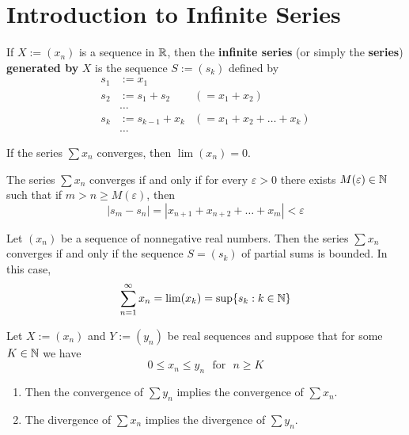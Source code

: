 \section{Introduction to Infinite Series}

\begin{definition}
	If $X:=(x_n)$ is a sequence in $\mathbb{R}$, then the \textbf{infinite series} (or simply the \textbf{series}) \textbf{generated by} $X$ is the sequence $S:= (s_k)$ defined by
	\begin{align*}
		s_1 & := x_1                                \\
		s_2 & := s_1 + s_2   & (=x_1 + x_2)         \\
		    & \dots                                 \\
		s_k & := s_{k-1}+x_k & (=x_1+x_2+\dots+x_k) \\
		    & \dots
	\end{align*}
\end{definition}

\begin{theorem}
	If the series $\sum x_n$ converges, then $\lim (x_n) = 0$.
\end{theorem}

\begin{theorem}
	The series $\sum x_n$ converges if and only if for every $\varepsilon >0$ there exists $M(\varepsilon) \in \mathbb{N}$ such that if $m>n\geq M(\varepsilon)$, then
	\[|s_m-s_n|=|x_{n+1}+x_{n+2}+\dots+x_m|<\varepsilon\]
\end{theorem}

\begin{theorem}
	Let $(x_n)$ be a sequence of nonnegative real numbers. Then the series $\sum x_n$ converges if and only if the sequence $S=(s_k)$ of partial sums is bounded. In this case,
	\[\sum\limits_{n=1}^{\infty}x_n = \lim (x_k) = \sup \{s_k:k \in \mathbb{N}\}\]
\end{theorem}

\begin{theorem}
	Let $X:=(x_n)$ and $Y:=(y_n)$ be real sequences and suppose that for some $K \in \mathbb{N}$ we have
	\[0 \leq x_n \leq y_n\ \ \ \text{for}\ \ \ n \geq K\]
	\begin{enumerate}
		\item Then the convergence of $\sum y_n$ implies the convergence of $\sum x_n$.
		\item The divergence of $\sum x_n$ implies the divergence of $\sum y_n$.
	\end{enumerate}
\end{theorem}

